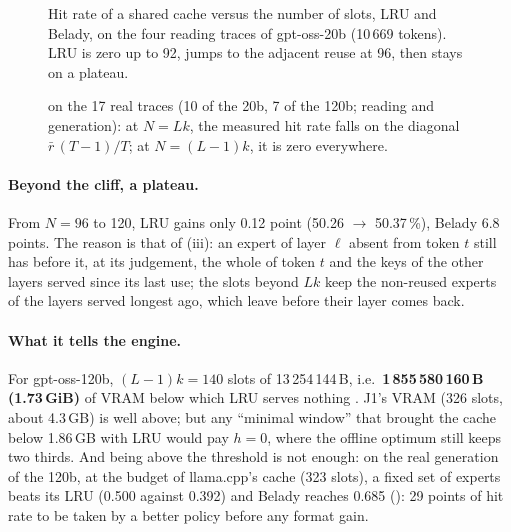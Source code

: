 \begin{figure}[ht]
\centering
\GrapheCchFalaise
\caption[The measured cliff]{Hit rate of a shared cache versus the number of slots, LRU and Belady, on the four reading traces of gpt-oss-20b (10\,669 tokens). LRU is zero up to 92, jumps to the adjacent reuse at 96, then stays on a plateau.}
\label{fig:t2o-falaise}
\end{figure}

\begin{figure}[ht]
\centering
\GrapheCchProp
\caption[The proposition checked on 17 traces]{ on the 17 real traces (10 of the 20b, 7 of the 120b; reading and generation): at $N = Lk$, the measured hit rate falls on the diagonal $\bar r\,(T-1)/T$; at $N = (L-1)k$, it is zero everywhere.}
\label{fig:t2o-prop}
\end{figure}

\paragraph{Beyond the cliff, a plateau.} From $N = 96$ to 120, LRU gains only 0.12 point (50.26 $\to$ 50.37\,\%), Belady 6.8 points. The reason is that of (iii): an expert of layer $\ell$ absent from token $t$ still has before it, at its judgement, the whole of token $t$ and the keys of the other layers served since its last use; the slots beyond $Lk$ keep the non-reused experts of the layers served longest ago, which leave before their layer comes back.

\paragraph{What it tells the engine.} For gpt-oss-120b, $(L-1)k = 140$ slots of 13\,254\,144\,B, i.e.\ \textbf{1\,855\,580\,160\,B (1.73\,GiB)} of VRAM below which LRU serves nothing \calc. J1's VRAM (326 slots, about 4.3\,GB) is well above; but any \enquote{minimal window} that brought the cache below 1.86\,GB with LRU would pay $h = 0$, where the offline optimum still keeps two thirds. And being above the threshold is not enough: on the real generation of the 120b, at the budget of llama.cpp's cache (323 slots), a fixed set of experts beats its LRU (0.500 against 0.392) and Belady reaches 0.685 (): 29 points of hit rate to be taken by a better policy before any format gain.

